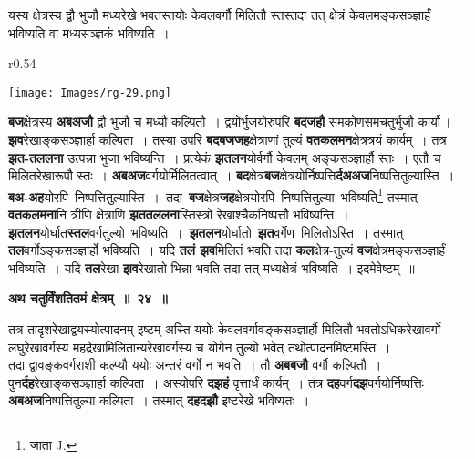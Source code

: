 \documentclass[11pt, openany]{book}
\begin{document}
 {\ab यस्य क्षेत्रस्य द्वौ भुजौ मध्यरेखे भवतस्तयोः केवलवर्गौ मिलितौ स्तस्तदा तत् क्षेत्रं केवलमङ्कसञ्ज्ञार्हं भविष्यति वा मध्यसञ्ज्ञकं भविष्यति~। }\\

\begin{wrapfigure}{r}{0.54\textwidth}
\vspace{-8mm}
\begin{center}
\texttt{[image: Images/rg-29.png]}
\end{center}
\vspace{-8mm}
\end{wrapfigure}

  \textbf{बज}क्षेत्रस्य \textbf{अबअजौ} द्वौ भुजौ च मध्यौ \;कल्पितौ~। \;द्वयोर्भुजयोरुपरि \textbf{बदजहौ} समकोणसमचतुर्भुजौ कार्यौ\,। \textbf{झव}रेखाङ्कसञ्ज्ञार्हा कल्पिता~। तस्या उपरि \textbf{बदबजजह}क्षेत्राणां तुल्यं  \textbf{वतकलमन}क्षेत्रत्रयं कार्यम्~। तत्र \textbf{झत-तललना} उत्पन्ना भुजा भविष्यन्ति~। प्रत्येकं \textbf{झतलन}योर्वर्गौ केवलम् अङ्कसञ्ज्ञार्हौ स्तः~। एतौ च मिलितरेखारूपौ स्तः~। \textbf{अबअज}वर्गयोर्मिलितत्वात्~। \textbf{बद}क्षेत्र\textbf{बज}क्षेत्रयोर्निष्पत्ति\textbf{र्दअअज}निष्पत्तितुल्यास्ति~। \textbf{बअ-अह}योरपि  \,निष्पत्तितुल्यास्ति~। \,तदा \,\textbf{बज}क्षेत्र\textbf{जह}क्षेत्रयोरपि \,निष्पत्तितुल्या \,भविष्यति\renewcommand{\thefootnote}{2}\footnote{जाता {\en J.}} तस्मात् \textbf{वतकलमना}नि त्रीणि क्षेत्राणि \textbf{झततललना}स्तिस्त्रो रेखाश्चैकनिष्पत्तौ भविष्यन्ति~। \textbf{झतलन}योर्घात\textbf{स्तल}वर्गतुल्यो \,भविष्यति~। \,\textbf{झतलन}योर्घातो \,\textbf{झत}वर्गेण \,मिलितोऽस्ति~। तस्मात् \textbf{तल}वर्गोऽङ्कसञ्ज्ञार्हो भविष्यति~। यदि \textbf{तलं झव}मिलितं भवति तदा \textbf{कल}क्षेत्र-तुल्यं \textbf{वज}क्षेत्रमङ्कसञ्ज्ञार्हं भविष्यति~। यदि \textbf{तल}रेखा \textbf{झव}रेखातो भिन्ना भवति तदा तत् मध्यक्षेत्रं भविष्यति~। इदमेवेष्टम्~॥ 
 
 \newpage
\begin{center} 
\textbf{\large अथ चतुर्विंशतितमं क्षेत्रम्~॥~२४~॥}
\end{center}

{\ab तत्र तादृशरेखाद्वयस्योत्पादनम् इष्टम् अस्ति ययोः केवलवर्गावङ्कसञ्ज्ञार्हौ मिलितौ भवतोऽधिकरेखावर्गो लघुरेखावर्गस्य महद्रेखामिलितान्यरेखावर्गस्य च योगेन तुल्यो भवेत् तथोत्पादनमिष्टमस्ति~। }\\

तदा द्वावङ्कवर्गराशी कल्प्यौ ययोः अन्तरं वर्गो न भवति~। तौ \textbf{अबबजौ} वर्गौ कल्पितौ~। पुन\textbf{र्दह}रेखाङ्कसञ्ज्ञार्हा कल्पिता~। अस्योपरि \textbf{दझहं} वृत्तार्धं कार्यम्~। तत्र \textbf{दह}वर्ग\textbf{दझ}वर्गयोर्निष्पत्तिः \textbf{अबअज}निष्पत्तितुल्या कल्पिता~। तस्मात् \textbf{दहदझौ} इष्टरेखे भविष्यतः~।
\end{document}
